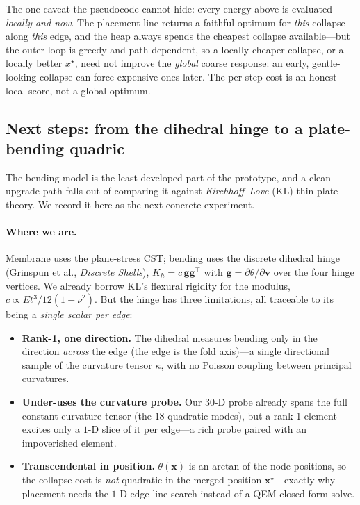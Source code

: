 \medskip
\noindent The one caveat the pseudocode cannot hide: every energy above is evaluated \emph{locally and now}.
The placement line returns a faithful optimum for \emph{this} collapse along \emph{this} edge, and the heap always spends the cheapest collapse available---but the outer loop is greedy and path-dependent, so a locally cheaper collapse, or a locally better $x^\star$, need not improve the \emph{global} coarse response: an early, gentle-looking collapse can force expensive ones later.
The per-step cost is an honest local score, not a global optimum.


\subsection{Next steps: from the dihedral hinge to a plate-bending quadric}

The bending model is the least-developed part of the prototype, and a clean upgrade path falls out of comparing it against \emph{Kirchhoff--Love} (KL) thin-plate theory.
We record it here as the next concrete experiment.

\paragraph{Where we are.}
Membrane uses the plane-stress CST; bending uses the discrete dihedral hinge (Grinspun et al., \emph{Discrete Shells}), $K_h=c\,\mathbf g\mathbf g^\top$ with $\mathbf g=\partial\theta/\partial\mathbf v$ over the four hinge vertices.
We already borrow KL's flexural rigidity for the modulus, $c\propto Et^3/12(1-\nu^2)$.
But the hinge has three limitations, all traceable to its being a \emph{single scalar per edge}:
\begin{itemize}
  \item \textbf{Rank-1, one direction.}
        The dihedral measures bending only in the direction \emph{across} the edge (the edge is the fold axis)---a single directional sample of the curvature tensor $\kappa$, with no Poisson coupling between principal curvatures.
  \item \textbf{Under-uses the curvature probe.}
        Our $30$-D probe already spans the full constant-curvature tensor (the $18$ quadratic modes), but a rank-1 element excites only a $1$-D slice of it per edge---a rich probe paired with an impoverished element.
  \item \textbf{Transcendental in position.}
        $\theta(\mathbf x)$ is an arctan of the node positions, so the collapse cost is \emph{not} quadratic in the merged position $\mathbf x^\star$---exactly why placement needs the $1$-D edge line search instead of a QEM closed-form solve.
\end{itemize}

